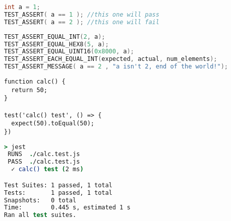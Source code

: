 \begin{lstlisting}[language=C, label={lst:unity-test-assert}, caption=Unity Basic Assertion Example
\cite{unity-homepage}]
int a = 1;
TEST_ASSERT( a == 1 ); //this one will pass
TEST_ASSERT( a == 2 ); //this one will fail
\end{lstlisting}

\begin{lstlisting}[language=c, label={lst:unity-more-test-assert}, caption=More advanced Unity Assertions
\cite{unity-github}]
TEST_ASSERT_EQUAL_INT(2, a);
TEST_ASSERT_EQUAL_HEX8(5, a);
TEST_ASSERT_EQUAL_UINT16(0x8000, a);
TEST_ASSERT_EACH_EQUAL_INT(expected, actual, num_elements);
TEST_ASSERT_MESSAGE( a == 2 , "a isn't 2, end of the world!");
\end{lstlisting}

\begin{lstlisting}[style=ES6, label=lst:jest-example, caption={Jest Unit Testing Example}]
function calc() {
  return 50;
}

test('calc() test', () => {
  expect(50).toEqual(50);
})
\end{lstlisting}

\begin{lstlisting}[language=csh, label=lst:jest-output, caption={Jest Unit
Testing Example Output}]
> jest
 RUNS  ./calc.test.js
 PASS  ./calc.test.js
  ✓ calc() test (2 ms)

Test Suites: 1 passed, 1 total
Tests:       1 passed, 1 total
Snapshots:   0 total
Time:        0.445 s, estimated 1 s
Ran all test suites.
\end{lstlisting}
